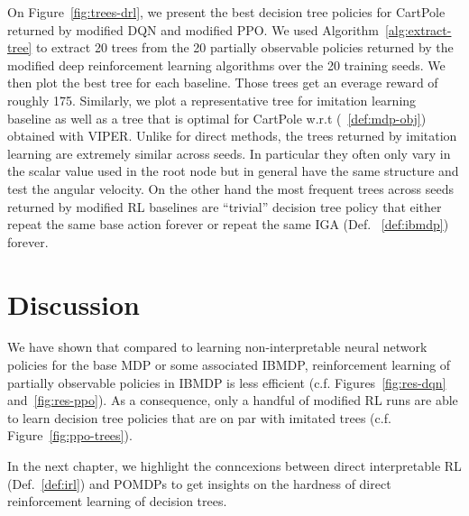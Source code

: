 On Figure~\ref{fig:trees-drl}, we present the best decision tree policies for CartPole returned by modified DQN and modified PPO.
We used Algorithm~\ref{alg:extract-tree} to extract 20 trees from the 20 partially observable policies returned by the modified deep reinforcement learning algorithms over the 20 training seeds.
We then plot the best tree for each baseline.
Those trees get an everage reward of roughly 175.
Similarly, we plot a representative tree for imitation learning baseline as well as a tree that is optimal for CartPole w.r.t (~\ref{def:mdp-obj}) obtained with VIPER. 
Unlike for direct methods, the trees returned by imitation learning are extremely similar across seeds. In particular they often only vary in the scalar value used in the root node but in general have the same structure and test the angular velocity.
On the other hand the most frequent trees across seeds returned by modified RL baselines are ``trivial'' decision tree policy that either repeat the same base action forever or repeat the same IGA (Def. ~\ref{def:ibmdp}) forever.


\section{Discussion}
We have shown that compared to learning non-interpretable neural network policies for the base MDP or some associated IBMDP, reinforcement learning of partially observable policies in IBMDP is less efficient (c.f. Figures~\ref{fig:res-dqn} and~\ref{fig:res-ppo}). 
As a consequence, only a handful of modified RL runs are able to learn decision tree policies that are on par with imitated trees (c.f. Figure~\ref{fig:ppo-trees}).

In the next chapter, we highlight the conncexions between direct interpretable RL (Def.~\ref{def:irl}) and POMDPs to get insights on the hardness of direct reinforcement learning of decision trees.
